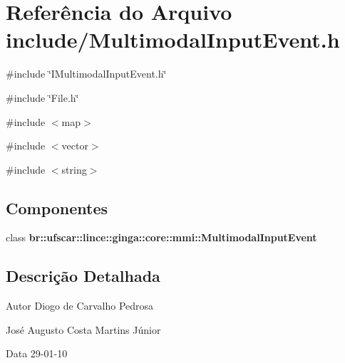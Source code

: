 \section{Referência do Arquivo include/MultimodalInputEvent.h}
\label{MultimodalInputEvent_8h}
{\ttfamily \#include \char`\"{}IMultimodalInputEvent.h\char`\"{}}\par
{\ttfamily \#include \char`\"{}File.h\char`\"{}}\par
{\ttfamily \#include $<$map$>$}\par
{\ttfamily \#include $<$vector$>$}\par
{\ttfamily \#include $<$string$>$}\par
\subsection*{Componentes}
\begin{DoxyCompactItemize}
\item 
class {\bf br::ufscar::lince::ginga::core::mmi::MultimodalInputEvent}
\end{DoxyCompactItemize}


\subsection{Descrição Detalhada}
\begin{DoxyAuthor}{Autor}
Diogo de Carvalho Pedrosa 

José Augusto Costa Martins Júnior 
\end{DoxyAuthor}
\begin{DoxyDate}{Data}
29-\/01-\/10 
\end{DoxyDate}
